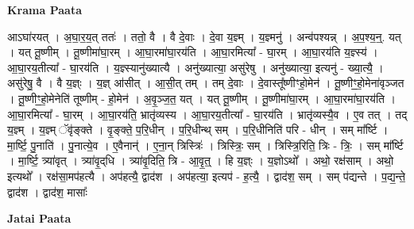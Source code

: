 \documentclass[17pt]{extarticle}
\begin{document}
\textbf{Krama Paata} \newline

आऽघा॑रयत् । अ॒घा॒र॒य॒त् ततः॑ । ततो॒ वै । वै दे॒वाः । दे॒वा य॒ज्ञ्म् । य॒ज्ञ्मनु॑ । अन्व॑पश्यन्न् । अ॒प॒श्य॒न्॒. यत् । यत् तू॒ष्णीम् । तू॒ष्णीमा॑घा॒रम् । आ॒घा॒रमा॑घा॒रय॑ति । आ॒घा॒रमित्या᳚ - घा॒रम् । आ॒घा॒रय॑ति य॒ज्ञ्स्य॑ । आ॒घा॒रय॒तीत्या᳚ - घा॒रय॑ति । य॒ज्ञ्स्यानु॑ख्यात्यै । अनु॑ख्यात्या॒ असु॑रेषु । अनु॑ख्यात्या॒ इत्यनु॑ - ख्या॒त्यै॒ । असु॑रेषु॒ वै । वै य॒ज्ञ्ः । य॒ज्ञ् आ॑सीत् । आ॒सी॒त् तम् । तम् दे॒वाः । दे॒वास्तू᳚ष्णीꣳहो॒मेन॑ । तू॒ष्णीꣳ॒॒हो॒मेना॑वृञ्जत । तू॒ष्णीꣳ॒॒हो॒मेनेति॑ तूष्णीम् - हो॒मेन॑ । अ॒वृ॒ञ्ज॒त॒ यत् । यत् तू॒ष्णीम् । तू॒ष्णीमा॑घा॒रम् । आ॒घा॒रमा॑घा॒रय॑ति । आ॒घा॒रमित्या᳚ - घा॒रम् । आ॒घा॒रय॑ति॒ भ्रातृ॑व्यस्य । आ॒घा॒रय॒तीत्या᳚ - घा॒रय॑ति । भ्रातृ॑व्यस्यै॒व । ए॒व तत् । तद् य॒ज्ञ्म् । य॒ज्ञ्म् ॅवृ॑ङ्‍क्ते । वृ॒ङ्‍क्ते॒ प॒रि॒धीन् । प॒रि॒धीन्थ् सम् । प॒रि॒धीनिति॑ परि - धीन् । सम् मा᳚र्ष्टि । मा॒र्ष्टि॒ पु॒नाति॑ । पु॒नात्ये॒व । ए॒वैनान्॑ । ए॒ना॒न् त्रिस्त्रिः॑ । त्रिस्त्रिः॒ सम् । त्रिस्त्रि॒रिति॒ त्रिः - त्रिः॒ । सम् मा᳚र्ष्टि । मा॒र्ष्टि॒ त्र्या॑वृत् । त्र्या॑वृ॒द्‌धि । त्र्या॑वृ॒दिति॒ त्रि - आ॒वृ॒त्॒ । हि य॒ज्ञ्ः । य॒ज्ञोऽथो᳚ । अथो॒ रक्ष॑साम् । अथो॒ इत्यथो᳚ । रक्ष॑सा॒मप॑हत्यै । अप॑हत्यै॒ द्वाद॑श । अप॑हत्या॒ इत्यप॑ - ह॒त्यै॒ । द्वाद॑श॒ सम् । सम् प॑द्यन्ते । प॒द्य॒न्ते॒ द्वाद॑श । द्वाद॑श॒ मासाः᳚ \newline

\textbf{Jatai Paata} \newline
\end{document}
